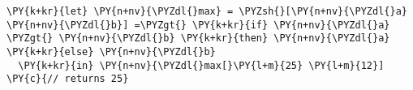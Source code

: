 \begin{Verbatim}[commandchars=\\\{\}]
\PY{k+kr}{let} \PY{n+nv}{\PYZdl{}max} = \PYZsh{}[\PY{n+nv}{\PYZdl{}a} \PY{n+nv}{\PYZdl{}b}] =\PYZgt{} \PY{k+kr}{if} \PY{n+nv}{\PYZdl{}a} \PYZgt{} \PY{n+nv}{\PYZdl{}b} \PY{k+kr}{then} \PY{n+nv}{\PYZdl{}a} \PY{k+kr}{else} \PY{n+nv}{\PYZdl{}b}
  \PY{k+kr}{in} \PY{n+nv}{\PYZdl{}max[}\PY{l+m}{25} \PY{l+m}{12}] \PY{c}{// returns 25}
\end{Verbatim}
